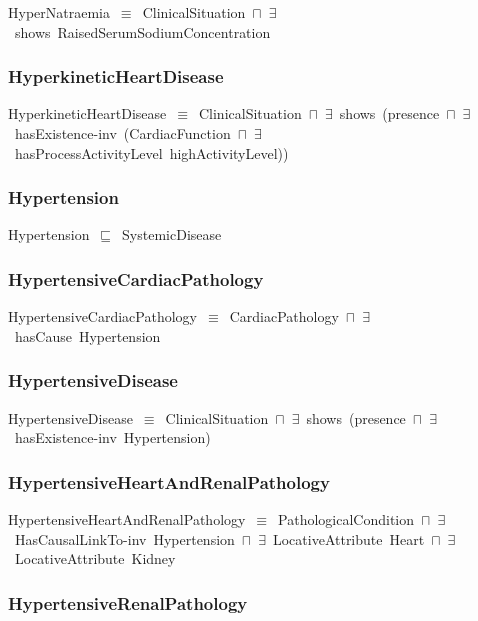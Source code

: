 \documentclass{article}
\begin{document}
HyperNatraemia~\ensuremath{\equiv}~ClinicalSituation~\ensuremath{\sqcap}~\ensuremath{\exists}~shows~RaisedSerumSodiumConcentration

\subsubsection*{HyperkineticHeartDisease}

HyperkineticHeartDisease~\ensuremath{\equiv}~ClinicalSituation~\ensuremath{\sqcap}~\ensuremath{\exists}~shows~(presence~\ensuremath{\sqcap}~\ensuremath{\exists}~hasExistence-inv~(CardiacFunction~\ensuremath{\sqcap}~\ensuremath{\exists}~hasProcessActivityLevel~highActivityLevel))

\subsubsection*{Hypertension}

Hypertension~\ensuremath{\sqsubseteq}~SystemicDisease~

\subsubsection*{HypertensiveCardiacPathology}

HypertensiveCardiacPathology~\ensuremath{\equiv}~CardiacPathology~\ensuremath{\sqcap}~\ensuremath{\exists}~hasCause~Hypertension

\subsubsection*{HypertensiveDisease}

HypertensiveDisease~\ensuremath{\equiv}~ClinicalSituation~\ensuremath{\sqcap}~\ensuremath{\exists}~shows~(presence~\ensuremath{\sqcap}~\ensuremath{\exists}~hasExistence-inv~Hypertension)

\subsubsection*{HypertensiveHeartAndRenalPathology}

HypertensiveHeartAndRenalPathology~\ensuremath{\equiv}~PathologicalCondition~\ensuremath{\sqcap}~\ensuremath{\exists}~HasCausalLinkTo-inv~Hypertension~\ensuremath{\sqcap}~\ensuremath{\exists}~LocativeAttribute~Heart~\ensuremath{\sqcap}~\ensuremath{\exists}~LocativeAttribute~Kidney

\subsubsection*{HypertensiveRenalPathology}
\end{document}
